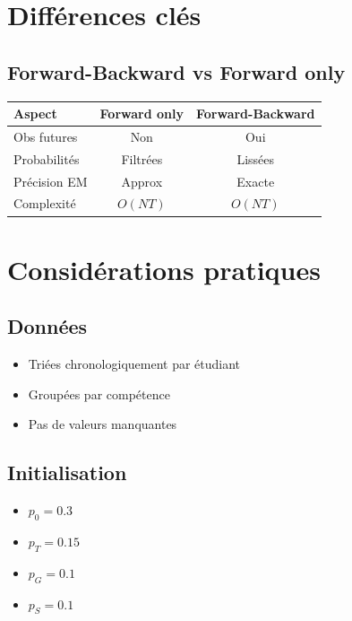 \documentclass[12pt]{article}
\begin{document}
\section{Différences clés}

\subsection{Forward-Backward vs Forward only}

\begin{table}[ht]
    \centering
    \begin{tabular}{|l|c|c|}
        \hline
        \textbf{Aspect} & \textbf{Forward only} & \textbf{Forward-Backward} \\
        \hline
        Obs futures     & Non                   & Oui                       \\
        Probabilités    & Filtrées              & Lissées                   \\
        Précision EM    & Approx                & Exacte                    \\
        Complexité      & $O(NT)$               & $O(NT)$                   \\
        \hline
    \end{tabular}
\end{table}

\section{Considérations pratiques}

\subsection{Données}

\begin{itemize}
    \item Triées chronologiquement par étudiant
    \item Groupées par compétence
    \item Pas de valeurs manquantes
\end{itemize}

\subsection{Initialisation}

\begin{itemize}
    \item $p_0 = 0.3$
    \item $p_T = 0.15$
    \item $p_G = 0.1$
    \item $p_S = 0.1$
\end{itemize}
\end{document}
